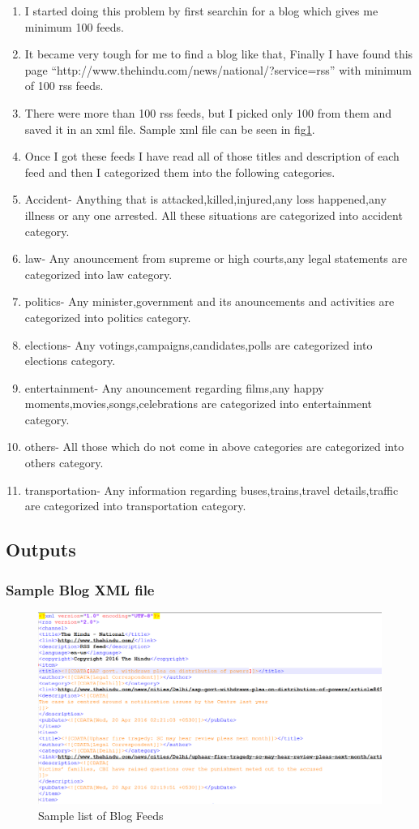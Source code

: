 \begin{enumerate}
\item I started doing this problem by first searchin for a blog which gives me minimum 100 feeds.
\item It became very tough for me to find a blog like that, Finally I have found this page ``http://www.thehindu.com/news/national/?service=rss'' with minimum of 100 rss feeds.
\item There were more than 100 rss feeds, but I picked only 100 from them and saved it in an xml file. Sample xml file can be seen in fig\ref{Sample1}.
\item Once I got these feeds I have read all of those titles and description of each feed and then I categorized them into the following categories.
\item Accident- Anything that is attacked,killed,injured,any loss happened,any illness or any one arrested. All these situations are categorized into accident category.
\item law- Any anouncement from supreme or high courts,any legal statements are categorized into law category.
\item politics-  Any minister,government and its anouncements and activities are categorized into politics category.
\item elections- Any votings,campaigns,candidates,polls are categorized into elections category.
\item entertainment- Any anouncement regarding films,any happy moments,movies,songs,celebrations are categorized into entertainment category.
\item others- All those which do not come in above categories are categorized into others category.
\item transportation- Any information regarding buses,trains,travel details,traffic are categorized into transportation category.
\end{enumerate}
\newpage

\subsection{Outputs}

\subsubsection{Sample Blog XML file}
\begin{figure}[ht]    
    \begin{center}
        \includegraphics[scale=0.4]{sample_xml.png}
        \caption{Sample list of Blog Feeds}
        \label{Sample1}
    \end{center}
\end{figure}
\newpage
